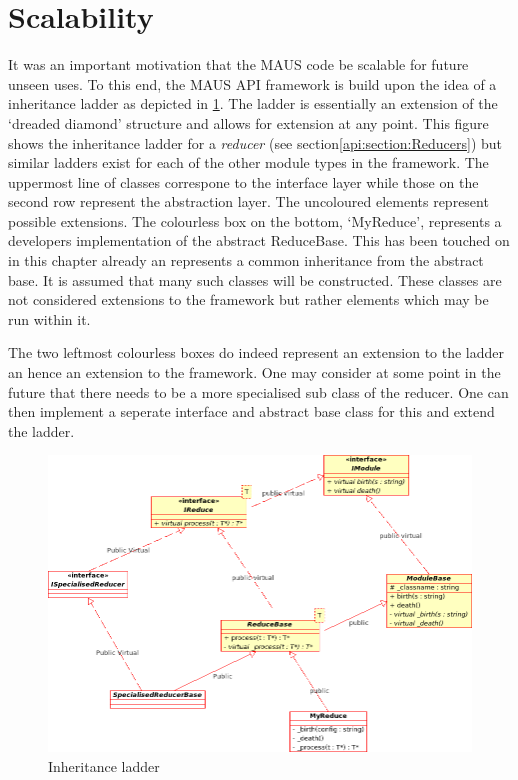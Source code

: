 \section{Scalability}
It was an important motivation that the MAUS code be scalable for future unseen uses. To this end, the MAUS API framework is build upon the idea of a inheritance ladder as depicted in \ref{api:inheritance_ladder}. The ladder is essentially an extension of the `dreaded diamond' structure and allows for extension at any point. This figure shows the inheritance ladder for a \emph{reducer} (see section\ref{api:section:Reducers}) but similar ladders exist for each of the other module types in the framework. The uppermost line of classes correspone to the interface layer while those on the second row represent the abstraction layer. The uncoloured elements represent possible extensions. The colourless box on the bottom, `MyReduce', represents a developers implementation of the abstract ReduceBase. This has been touched on in this chapter already an represents a common inheritance from the abstract base. It is assumed that many such classes will be constructed. These classes are not considered extensions to the framework but rather elements which may be run within it.

The two leftmost colourless boxes do indeed represent an extension to the ladder an hence an extension to the framework. One may consider at some point in the future that there needs to be a more specialised sub class of the reducer. One can then implement a seperate interface and abstract base class for this and extend the ladder.
\begin{figure}[!h]
  \label{api:inheritance_ladder}
  \begin{center}
  \end{center}
    \includegraphics[scale=0.35]{MausApiInheritanceLadder}
  \caption{Inheritance ladder}
\end{figure}

